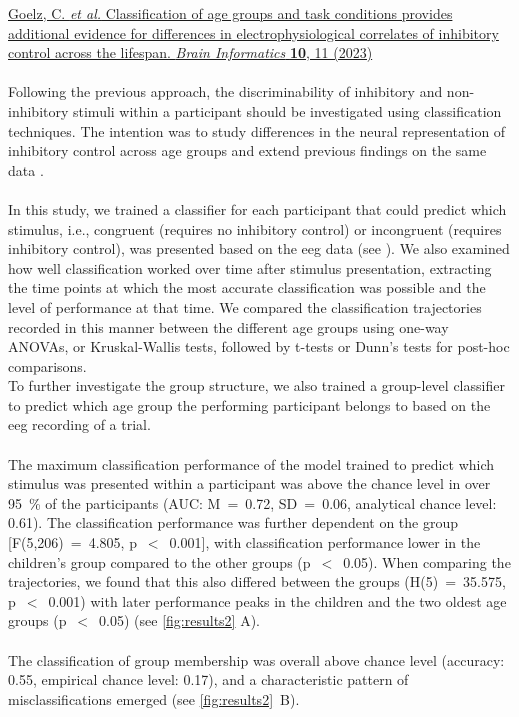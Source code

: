 \hyperref[pub:paperII]{Goelz, C. \textit{et al.} Classification of age groups and task conditions provides additional evidence for differences in electrophysiological correlates of inhibitory control across the lifespan. \textit{Brain Informatics} \textbf{10}, 11 (2023)}\\
\\
Following the previous approach, the discriminability of inhibitory and non-inhibitory stimuli within a participant should be investigated using classification techniques. The intention was to study differences in the neural representation of inhibitory control across age groups and extend previous findings on the same data \cite{Reuter2019}.\\
\\
In this study, we trained a classifier for each participant that could predict which stimulus, i.e., congruent (requires no inhibitory control) or incongruent (requires inhibitory control), was presented based on the \gls{eeg} data (see ). We also examined how well classification worked over time after stimulus presentation, extracting the time points at which the most accurate classification was possible and the level of performance at that time. We compared the classification trajectories recorded in this manner between the different age groups using one-way ANOVAs, or Kruskal-Wallis tests, followed by t-tests or Dunn's tests for post-hoc comparisons.\\
To further investigate the group structure, we also trained a group-level classifier to predict which age group the performing participant belongs to based on the \gls{eeg} recording of a trial.\\
\\
The maximum classification performance of the model trained to predict which stimulus was presented within a participant was above the chance level in over 95~\% of the participants (AUC: M~=~0.72, SD~=~0.06, analytical chance level: 0.61). The classification performance was further dependent on the group [F(5,206)~=~4.805, p~$<$~0.001], with classification performance lower in the children's group compared to the other groups (p~$<$~0.05). When comparing the trajectories, we found that this also differed between the groups (H(5)~=~35.575, p~$<$~0.001) with later performance peaks in the children and the two oldest age groups (p~$<$~0.05) (see \autoref{fig:results2} A).\\
\\
The classification of group membership was overall above chance level (accuracy: 0.55, empirical chance level: 0.17), and a characteristic pattern of misclassifications emerged (see \autoref{fig:results2}~B).\\
